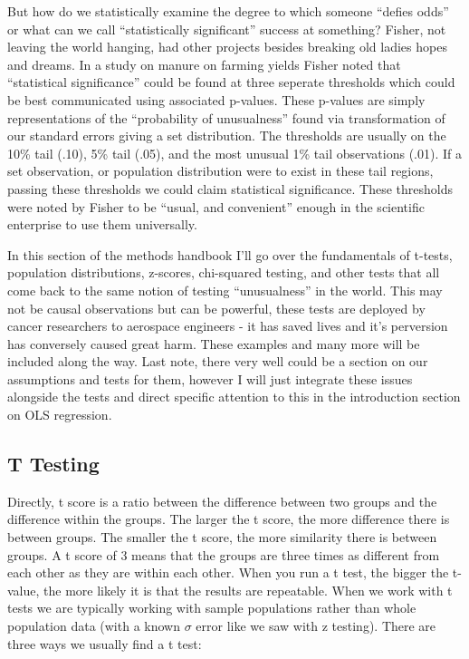 \documentclass[12pt]{article}\usepackage[]{graphicx}\usepackage[]{color}
\begin{document}
\begin{flushleft}
But how do we statistically examine the degree to which someone ``defies odds'' or what can we call ``statistically significant'' success at something? Fisher, not leaving the world hanging, had other projects besides breaking old ladies hopes and dreams. In a study on manure on farming yields Fisher noted that ``statistical significance'' could be found at three seperate thresholds which could be best communicated using associated p-values. These p-values are simply representations of the ``probability of unusualness'' found via transformation of our standard errors giving a set distribution. The thresholds are usually on the 10\% tail (.10), 5\% tail (.05), and the most unusual 1\% tail observations (.01). If a set observation, or population distribution were to exist in these tail regions, passing these thresholds we could claim statistical significance. These thresholds were noted by Fisher to be ``usual, and convenient'' enough in the scientific enterprise to use them universally.

In this section of the methods handbook I'll go over the fundamentals of t-tests, population distributions, z-scores, chi-squared testing, and other tests that all come back to the same notion of testing ``unusualness'' in the world. This may not be causal observations but can be powerful, these tests are deployed by cancer researchers to aerospace engineers - it has saved lives and it's perversion has conversely caused great harm. These examples and many more will be included along the way. Last note, there very well could be a section on our assumptions and tests for them, however I will just integrate these issues alongside the tests and direct specific attention to this in the introduction section on OLS regression.

\subsection{T Testing}

Directly, t score is a ratio between the difference between two groups and the difference within the groups. The larger the t score, the more difference there is between groups. The smaller the t score, the more similarity there is between groups. A t score of 3 means that the groups are three times as different from each other as they are within each other. When you run a t test, the bigger the t-value, the more likely it is that the results are repeatable. When we work with t tests we are typically working with sample populations rather than whole population data (with a known $\sigma$ error like we saw with z testing). There are three ways we usually find a t test:


\end{flushleft}
\end{document}
